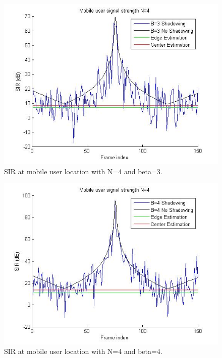 \documentclass{article}
\begin{document}
\begin{figure}[h]
\centerline{\includegraphics[width=5in]{latex/images/N4B3.jpg}}
\caption{SIR at mobile user location with N=4 and beta=3.}
\label{N4B3}
\end{figure}

\begin{figure}[h]
\centerline{\includegraphics[width=5in]{latex/images/N4B4.jpg}}
\caption{SIR at mobile user location with N=4 and beta=4.}
\label{N4B4}
\end{figure}
\end{document}
